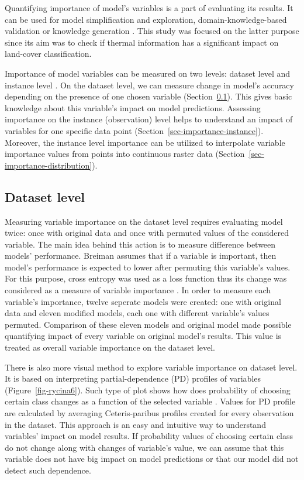 \documentclass{amuthesis}
\begin{document}
Quantifying importance of model's variables is a part of evaluating its
results. It can be used for model simplification and exploration,
domain-knowledge-based validation or knowledge generation
\autocite{biecek_explanatory_2021}. This study was focused on the latter
purpose since its aim was to check if thermal information has a
significant impact on land-cover classification.

Importance of model variables can be measured on two levels: dataset
level and instance level \autocite{biecek_explanatory_2021}. On the
dataset level, we can measure change in model's accuracy depending on
the presence of one chosen variable
(Section~\ref{sec-importance-dataset}). This gives basic knowledge about
this variable's impact on model predictions. Assessing importance on the
instance (observation) level helps to understand an impact of variables
for one specific data point (Section~\ref{sec-importance-instance}).
Moreover, the instance level importance can be utilized to interpolate
variable importance values from points into continuous raster data
(Section~\ref{sec-importance-distribution}).

\hypertarget{sec-importance-dataset}{%
\subsection{Dataset level}\label{sec-importance-dataset}}

Measuring variable importance on the dataset level requires evaluating
model twice: once with original data and once with permuted values of
the considered variable. The main idea behind this action is to measure
difference between models' performance. Breiman
\autocite*{breiman_random_2001} assumes that if a variable is important,
then model's performance is expected to lower after permuting this
variable's values. For this purpose, cross entropy was used as a loss
function thus its change was considered as a measure of variable
importance \autocite{biecek_explanatory_2021}. In order to measure each
variable's importance, twelve seperate models were created: one with
original data and eleven modified models, each one with different
variable's values permuted. Comparison of these eleven models and
original model made possible quantifying impact of every variable on
original model's results. This value is treated as overall variable
importance on the dataset level.

There is also more visual method to explore variable importance on
dataset level. It is based on interpreting partial-dependence (PD)
profiles of variables (Figure~\ref{fig-rycina6}). Such type of plot
shows how does probability of choosing certain class changes as a
function of the selected variable \autocite{biecek_explanatory_2021}.
Values for PD profile are calculated by averaging Ceteris-paribus
profiles created for every observation in the dataset. This approach is
an easy and intuitive way to understand variables' impact on model
results. If probability values of choosing certain class do not change
along with changes of variable's value, we can assume that this variable
does not have big impact on model predictions or that our model did not
detect such dependence.
\end{document}
